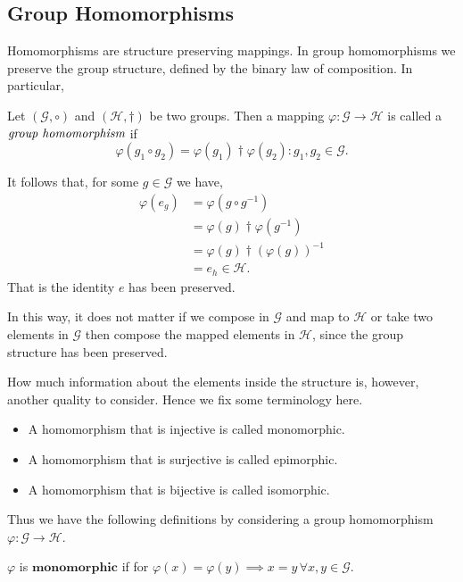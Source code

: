 
\subsection{Group Homomorphisms} %
\label{subsec:homomorphisms}

Homomorphisms are structure preserving mappings. In group homomorphisms we preserve the
group structure, defined by the binary law of composition. In particular,

\begin{defn}
	Let $(\mathcal{G}, \circ)$ and $(\mathcal{H},\dagger)$ be two groups. Then a mapping
	$\varphi : \mathcal{G} \to \mathcal{H}$ is called a $\emph{group homomorphism}$ if
	\[
		\varphi(g_1 \circ g_2) = \varphi(g_1) \dagger \varphi(g_2) : g_1,g_2 \in \mathcal{G}.
	\]
\end{defn}

It follows that, for some $g \in \mathcal{G}$ we have,
\begin{align*}
	\varphi ( e_g ) &= \varphi (g \circ g^{-1})
	\\
	&= \varphi (g) \dagger \varphi (g^{-1})
	\\
	&= \varphi (g) \dagger (\varphi (g) )^{-1}
	\\
	&= e_h \in \mathcal{H}.
\end{align*}
That is the identity $e$ has been preserved.

In this way, it does not matter if we compose in $\mathcal{G}$ and map to $\mathcal{H}$ or take two elements
in $\mathcal{G}$ then compose the mapped elements in $\mathcal{H}$, since the group structure has been preserved.

How much information about the elements inside the structure is, however, another quality to consider. Hence we fix some
terminology here.
\begin{itemize}
	\item A homomorphism that is injective is called monomorphic.
	\item A homomorphism that is surjective is called epimorphic.
	\item A homomorphism that is bijective is called isomorphic.
\end{itemize}
Thus we have the following definitions by considering a group homomorphism $\varphi : \mathcal{G} \to \mathcal{H}$.

\begin{defn}[Monomorphic]
	$\varphi$ is $\textbf{monomorphic}$ if for $\varphi(x) = \varphi(y) \implies x = y \, \forall x,y \in \mathcal{G}$.
\end{defn}

